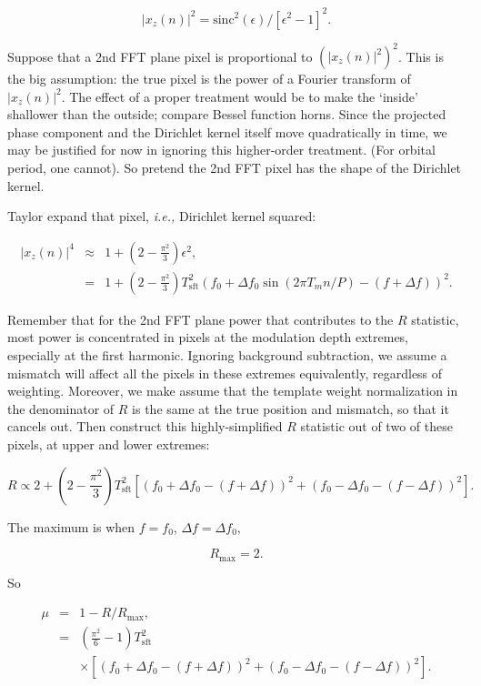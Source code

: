 \documentclass{article}
\begin{document}
\begin{equation}
|x_z (n)|^2 = \mathrm{sinc}^2(\epsilon)/[\epsilon^2-1]^2.
\end{equation}

Suppose that a 2nd FFT plane pixel is proportional to $(|x_z(n)|^2)^2$. This is the
big assumption: the true pixel is the power of a Fourier transform of
$|x_z(n)|^2$. The effect of a proper treatment would be to make the
`inside' shallower than the outside; compare Bessel function horns.
Since the projected phase component and the Dirichlet kernel itself move
quadratically in time, we may be justified for now in ignoring this
higher-order treatment. (For orbital period, one cannot). So pretend the
2nd FFT pixel has the shape of the Dirichlet kernel.

Taylor expand that pixel, \textit{i.e.,} Dirichlet kernel squared:

\begin{eqnarray}
|x_z (n)|^4 & \approx & 1 + \left(2- \frac{\pi^2}{3}\right) \epsilon^2,\\
             &=& 1 + \left(2 -\frac{\pi^2}{3}\right) T_\mathrm{sft}^2
                 (f_0+ \Delta f_0 \sin(2\pi T_m n /P) - (f+\Delta f))^2.
\end{eqnarray}

Remember that for the 2nd FFT plane power that contributes to the $R$ statistic, most power is concentrated in pixels at the modulation depth extremes, especially at the first harmonic.
Ignoring background subtraction, we assume a mismatch will affect all the pixels in these extremes equivalently, regardless of weighting.
Moreover, we make assume that the template weight normalization in the denominator of $R$ is the same at the true position and mismatch, so that it cancels out.
Then construct this highly-simplified $R$ statistic out of two of these pixels, at upper and
lower extremes:

\begin{equation}
R \propto 2 + \left(2 -\frac{\pi^2}{3}\right) T_\mathrm{sft}^2
             [(f_0+\Delta f_0- (f+\Delta f))^2 + (f_0-\Delta f_0- (f-\Delta f))^2].
\end{equation}

\noindent
The maximum is when $f=f_0$, $\Delta f = \Delta f_0$,

\begin{equation}
R_\mathrm{max} = 2.
\end{equation}

\noindent So 

\begin{eqnarray}
\mu &=& 1 - R / R_\mathrm{max},\\
      &=& \left(\frac{\pi^2}{6} - 1\right) T_\mathrm{sft}^2 \nonumber \\
      &~& \times [(f_0+\Delta f_0- (f+\Delta f))^2 + (f_0-\Delta f_0- (f- \Delta f))^2].
\end{eqnarray}
\end{document}
